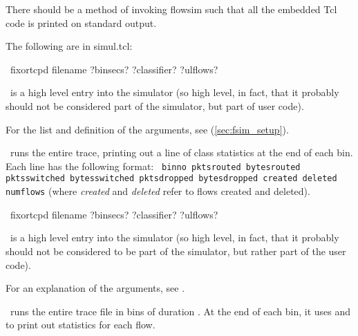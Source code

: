 \documentclass{article}
\begin{document}
\BUGS

There should be a method of invoking flowsim such that all the embedded
Tcl code is printed on standard output.

\manend

The following are in simul.tcl:


\SYNOPSIS \cmdname\ fixortcpd filename ?binsecs? ?classifier? ?ulflows?

\cmdname\ is a high level entry into the simulator (so high level, in
fact, that it probably should not be considered part of the simulator,
but part of user code).

For the list and definition of the arguments, see 
(\ref{sec:fsim_setup}).

\cmdname\ runs the entire trace, printing out a line of class
statistics at the end of each bin.  Each line has the following format:
\texttt{
binno pktsrouted bytesrouted pktsswitched bytesswitched
pktsdropped bytesdropped created deleted numflows}
(where \emph{created} and \emph{deleted} refer to flows created and
deleted).

\SEEALSO


\manend


\SYNOPSIS \cmdname\ fixortcpd filename ?binsecs? ?classifier? ?ulflows?

\cmdname\ is a high level entry into the simulator (so high level, in
fact, that it probably should not be considered to be part of the
simulator, but rather part of the user code).

For an explanation of the arguments, see .

\cmdname\ runs the entire trace file in bins of duration
.  At the end of each bin, it uses
 and  to
print out statistics for each flow.

\SEEALSO


\manend

\label{sec:fsim_setup}
\end{document}
